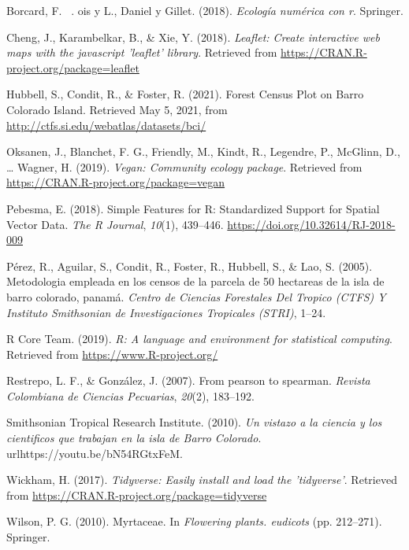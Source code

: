 \documentclass[11pt,]{article}
\begin{document}
\hypertarget{ref-borcard2018numerical}{}
Borcard, F. ~. ois y L., Daniel y Gillet. (2018). \emph{Ecología
numérica con r}. Springer.

\hypertarget{ref-leaflet}{}
Cheng, J., Karambelkar, B., \& Xie, Y. (2018). \emph{Leaflet: Create
interactive web maps with the javascript 'leaflet' library}. Retrieved
from \url{https://CRAN.R-project.org/package=leaflet}

\hypertarget{ref-webcenso}{}
Hubbell, S., Condit, R., \& Foster, R. (2021). Forest Census Plot on
Barro Colorado Island. Retrieved May 5, 2021, from
\url{http://ctfs.si.edu/webatlas/datasets/bci/}

\hypertarget{ref-vegan}{}
Oksanen, J., Blanchet, F. G., Friendly, M., Kindt, R., Legendre, P.,
McGlinn, D., \ldots{} Wagner, H. (2019). \emph{Vegan: Community ecology
package}. Retrieved from \url{https://CRAN.R-project.org/package=vegan}

\hypertarget{ref-sf}{}
Pebesma, E. (2018). Simple Features for R: Standardized Support for
Spatial Vector Data. \emph{The R Journal}, \emph{10}(1), 439--446.
\url{https://doi.org/10.32614/RJ-2018-009}

\hypertarget{ref-perez2005metodologia}{}
Pérez, R., Aguilar, S., Condit, R., Foster, R., Hubbell, S., \& Lao, S.
(2005). Metodologia empleada en los censos de la parcela de 50 hectareas
de la isla de barro colorado, panamá. \emph{Centro de Ciencias
Forestales Del Tropico (CTFS) Y Instituto Smithsonian de Investigaciones
Tropicales (STRI)}, 1--24.

\hypertarget{ref-citadeR}{}
R Core Team. (2019). \emph{R: A language and environment for statistical
computing}. Retrieved from \url{https://www.R-project.org/}

\hypertarget{ref-restrepo2007pearson}{}
Restrepo, L. F., \& González, J. (2007). From pearson to spearman.
\emph{Revista Colombiana de Ciencias Pecuarias}, \emph{20}(2), 183--192.

\hypertarget{ref-bci_video}{}
Smithsonian Tropical Research Institute. (2010). \emph{Un vistazo a la
ciencia y los cientificos que trabajan en la isla de Barro Colorado}.
urlhttps://youtu.be/bN54RGtxFeM.

\hypertarget{ref-tidyverse}{}
Wickham, H. (2017). \emph{Tidyverse: Easily install and load the
'tidyverse'}. Retrieved from
\url{https://CRAN.R-project.org/package=tidyverse}

\hypertarget{ref-wilson2010myrtaceae}{}
Wilson, P. G. (2010). Myrtaceae. In \emph{Flowering plants. eudicots}
(pp. 212--271). Springer.




\newpage
\singlespacing 
\end{document}
